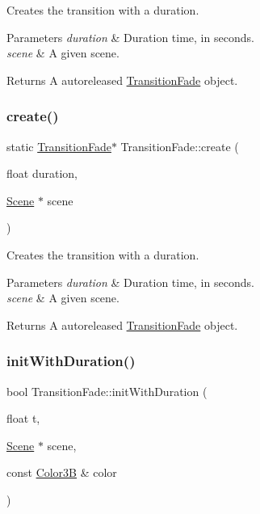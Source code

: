 Creates the transition with a duration.


\begin{DoxyParams}{Parameters}
{\em duration} & Duration time, in seconds. \\
\hline
{\em scene} & A given scene. \\
\hline
\end{DoxyParams}
\begin{DoxyReturn}{Returns}
A autoreleased \hyperlink{classTransitionFade}{Transition\+Fade} object. 
\end{DoxyReturn}
\mbox{\label{classTransitionFade_af23a63c5cace211df2f0daf7e506e18c}} 
\subsubsection{\texorpdfstring{create()}{create()}\hspace{0.1cm}{\footnotesize\ttfamily [4/4]}}
{\footnotesize\ttfamily static \hyperlink{classTransitionFade}{Transition\+Fade}$\ast$ Transition\+Fade\+::create (\begin{DoxyParamCaption}\item[{float}]{duration,  }\item[{\hyperlink{classScene}{Scene} $\ast$}]{scene }\end{DoxyParamCaption})\hspace{0.3cm}{\ttfamily [static]}}

Creates the transition with a duration.


\begin{DoxyParams}{Parameters}
{\em duration} & Duration time, in seconds. \\
\hline
{\em scene} & A given scene. \\
\hline
\end{DoxyParams}
\begin{DoxyReturn}{Returns}
A autoreleased \hyperlink{classTransitionFade}{Transition\+Fade} object. 
\end{DoxyReturn}
\mbox{\label{classTransitionFade_ac2caf085c6ebb62005f7c87a15f0920f}} 
\subsubsection{\texorpdfstring{init\+With\+Duration()}{initWithDuration()}\hspace{0.1cm}{\footnotesize\ttfamily [1/2]}}
{\footnotesize\ttfamily bool Transition\+Fade\+::init\+With\+Duration (\begin{DoxyParamCaption}\item[{float}]{t,  }\item[{\hyperlink{classScene}{Scene} $\ast$}]{scene,  }\item[{const \hyperlink{structColor3B}{Color3B} \&}]{color }\end{DoxyParamCaption})}

